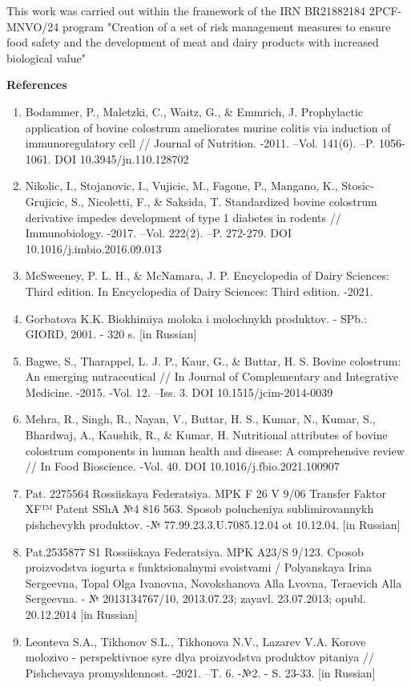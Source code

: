 This work was carried out within the framework of the IRN BR21882184
2PCF-MNVO/24 program "Creation of a set of risk management measures to
ensure food safety and the development of meat and dairy products with
increased biological value"

{\bfseries References}

\begin{enumerate}
\def\labelenumi{\arabic{enumi}.}
\item
  Bodammer, P., Maletzki, C., Waitz, G., \& Emmrich, J. Prophylactic
  application of bovine colostrum ameliorates murine colitis via
  induction of immunoregulatory cell // Journal of Nutrition. -2011.
  --Vol. 141(6). --P. 1056-1061. DOI 10.3945/jn.110.128702
\item
  Nikolic, I., Stojanovic, I., Vujicic, M., Fagone, P., Mangano, K.,
  Stosic-Grujicic, S., Nicoletti, F., \& Saksida, T. Standardized bovine
  colostrum derivative impedes development of type 1 diabetes in rodents
  // Immunobiology. -2017. --Vol. 222(2). --P. 272-279. DOI
  10.1016/j.imbio.2016.09.013
\item
  McSweeney, P. L. H., \& McNamara, J. P. Encyclopedia of Dairy
  Sciences: Third edition. In Encyclopedia of Dairy Sciences: Third
  edition. -2021.
\item
  Gorbatova K.K. Biokhimiya moloka i molochnykh produktov. - SPb.:
  GIORD, 2001. - 320 s. {[}in Russian{]}
\item
  Bagwe, S., Tharappel, L. J. P., Kaur, G., \& Buttar, H. S. Bovine
  colostrum: An emerging nutraceutical // In Journal of Complementary
  and Integrative Medicine. -2015. -Vol. 12. --Iss. 3. DOI
  10.1515/jcim-2014-0039
\item
  Mehra, R., Singh, R., Nayan, V., Buttar, H. S., Kumar, N., Kumar, S.,
  Bhardwaj, A., Kaushik, R., \& Kumar, H. Nutritional attributes of
  bovine colostrum components in human health and disease: A
  comprehensive review // In Food Bioscience. -Vol. 40. DOI
  10.1016/j.fbio.2021.100907
\item
  Pat. 2275564 Rossiiskaya Federatsiya. MPK F 26 V 9/06 Transfer Faktor
  XF™ Patent SShA №4 816 563. Sposob polucheniya sublimirovannykh
  pishchevykh produktov. -№ 77.99.23.3.U.7085.12.04 ot 10.12.04. {[}in
  Russian{]}
\item
  Pat.2535877 S1 Rossiiskaya Federatsiya. MPK A23/S 9/123. Cposob
  proizvodstva iogurta s funktsional\textquotesingle nymi svoistvami /
  Polyanskaya Irina Sergeevna, Topal Ol\textquotesingle ga Ivanovna,
  Novokshanova Alla L\textquotesingle vovna, Teraevich Alla Sergeevna. -
  № 2013134767/10, 2013.07.23; zayavl. 23.07.2013; opubl. 20.12.2014
  {[}in Russian{]}
\item
  Leont\textquotesingle eva S.A., Tikhonov S.L., Tikhonova N.V., Lazarev
  V.A. Korov\textquotesingle e molozivo - perspektivnoe
  syr\textquotesingle e dlya proizvodstva produktov pitaniya //
  Pishchevaya promyshlennost\textquotesingle. -2021. --T. 6. -№2. - S.
  23-33. {[}in Russian{]}
\end{enumerate}

